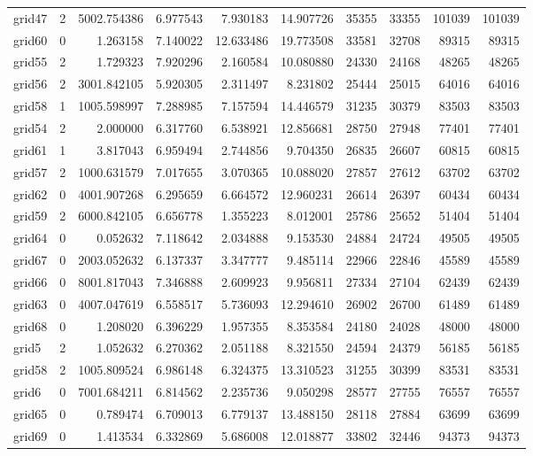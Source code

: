 \begin{longtable}{|l|r|r|r|r|r|r|r|r|r|}
grid47 & 2 & 5002.754386 & 6.977543 & 7.930183 & 14.907726 & 35355 & 33355 & 101039 & 101039 \\
grid60 & 0 & 1.263158 & 7.140022 & 12.633486 & 19.773508 & 33581 & 32708 & 89315 & 89315 \\
grid55 & 2 & 1.729323 & 7.920296 & 2.160584 & 10.080880 & 24330 & 24168 & 48265 & 48265 \\
grid56 & 2 & 3001.842105 & 5.920305 & 2.311497 & 8.231802 & 25444 & 25015 & 64016 & 64016 \\
grid58 & 1 & 1005.598997 & 7.288985 & 7.157594 & 14.446579 & 31235 & 30379 & 83503 & 83503 \\
grid54 & 2 & 2.000000 & 6.317760 & 6.538921 & 12.856681 & 28750 & 27948 & 77401 & 77401 \\
grid61 & 1 & 3.817043 & 6.959494 & 2.744856 & 9.704350 & 26835 & 26607 & 60815 & 60815 \\
grid57 & 2 & 1000.631579 & 7.017655 & 3.070365 & 10.088020 & 27857 & 27612 & 63702 & 63702 \\
grid62 & 0 & 4001.907268 & 6.295659 & 6.664572 & 12.960231 & 26614 & 26397 & 60434 & 60434 \\
grid59 & 2 & 6000.842105 & 6.656778 & 1.355223 & 8.012001 & 25786 & 25652 & 51404 & 51404 \\
grid64 & 0 & 0.052632 & 7.118642 & 2.034888 & 9.153530 & 24884 & 24724 & 49505 & 49505 \\
grid67 & 0 & 2003.052632 & 6.137337 & 3.347777 & 9.485114 & 22966 & 22846 & 45589 & 45589 \\
grid66 & 0 & 8001.817043 & 7.346888 & 2.609923 & 9.956811 & 27334 & 27104 & 62439 & 62439 \\
grid63 & 0 & 4007.047619 & 6.558517 & 5.736093 & 12.294610 & 26902 & 26700 & 61489 & 61489 \\
grid68 & 0 & 1.208020 & 6.396229 & 1.957355 & 8.353584 & 24180 & 24028 & 48000 & 48000 \\
grid5 & 2 & 1.052632 & 6.270362 & 2.051188 & 8.321550 & 24594 & 24379 & 56185 & 56185 \\
grid58 & 2 & 1005.809524 & 6.986148 & 6.324375 & 13.310523 & 31255 & 30399 & 83531 & 83531 \\
grid6 & 0 & 7001.684211 & 6.814562 & 2.235736 & 9.050298 & 28577 & 27755 & 76557 & 76557 \\
grid65 & 0 & 0.789474 & 6.709013 & 6.779137 & 13.488150 & 28118 & 27884 & 63699 & 63699 \\
grid69 & 0 & 1.413534 & 6.332869 & 5.686008 & 12.018877 & 33802 & 32446 & 94373 & 94373 \\

\end{longtable}
